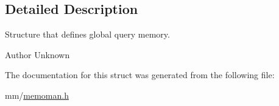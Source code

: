 \subsection{Detailed Description}
Structure that defines global query memory. 

\begin{DoxyAuthor}{Author}
Unknown 
\end{DoxyAuthor}


The documentation for this struct was generated from the following file\+:\begin{DoxyCompactItemize}
\item 
mm/\hyperlink{memoman_8h}{memoman.\+h}\end{DoxyCompactItemize}
